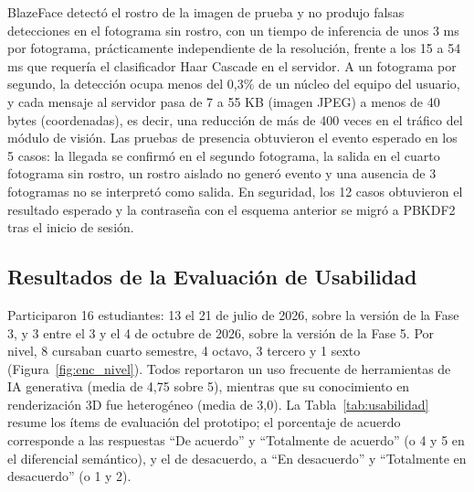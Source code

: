 BlazeFace detectó el rostro de la imagen de prueba y no produjo falsas detecciones en el fotograma sin rostro, con un tiempo de inferencia de unos 3 ms por fotograma, prácticamente independiente de la resolución, frente a los 15 a 54 ms que requería el clasificador Haar Cascade en el servidor. A un fotograma por segundo, la detección ocupa menos del 0,3\% de un núcleo del equipo del usuario, y cada mensaje al servidor pasa de 7 a 55 KB (imagen JPEG) a menos de 40 bytes (coordenadas), es decir, una reducción de más de 400 veces en el tráfico del módulo de visión. Las pruebas de presencia obtuvieron el evento esperado en los 5 casos: la llegada se confirmó en el segundo fotograma, la salida en el cuarto fotograma sin rostro, un rostro aislado no generó evento y una ausencia de 3 fotogramas no se interpretó como salida. En seguridad, los 12 casos obtuvieron el resultado esperado y la contraseña con el esquema anterior se migró a PBKDF2 tras el inicio de sesión.

\subsection{Resultados de la Evaluación de Usabilidad}
Participaron 16 estudiantes: 13 el 21 de julio de 2026, sobre la versión de la Fase 3, y 3 entre el 3 y el 4 de octubre de 2026, sobre la versión de la Fase 5. Por nivel, 8 cursaban cuarto semestre, 4 octavo, 3 tercero y 1 sexto (Figura~\ref{fig:enc_nivel}). Todos reportaron un uso frecuente de herramientas de IA generativa (media de 4,75 sobre 5), mientras que su conocimiento en renderización 3D fue heterogéneo (media de 3,0). La Tabla~\ref{tab:usabilidad} resume los ítems de evaluación del prototipo; el porcentaje de acuerdo corresponde a las respuestas ``De acuerdo'' y ``Totalmente de acuerdo'' (o 4 y 5 en el diferencial semántico), y el de desacuerdo, a ``En desacuerdo'' y ``Totalmente en desacuerdo'' (o 1 y 2).

